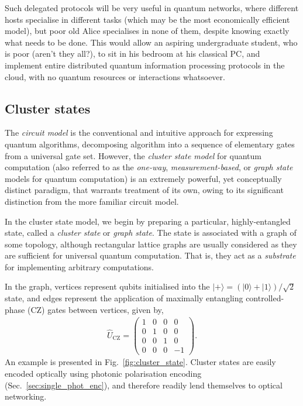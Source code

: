 \documentclass[aps,rmp,twocolumn,amsmath,amssymb,nofootinbib,superscriptaddress,longbibliography,floatfix]{revtex4-1}
\newcommand{\ket}[1]{|#1\rangle}
\begin{document}
Such delegated protocols will be very useful in quantum networks, where different hosts specialise in different tasks (which may be the most economically efficient model), but poor old Alice specialises in none of them, despite knowing exactly what needs to be done. This would allow an aspiring undergraduate student, who is poor (aren't they all?), to sit in his bedroom at his classical PC, and implement entire distributed quantum information processing protocols in the cloud, with no quantum resources or interactions whatsoever.

%
%

\subsection{Cluster states} \label{sec:CSQC}

The \emph{circuit model} is the conventional and intuitive approach for expressing quantum algorithms, decomposing algorithm into a sequence of elementary gates from a universal gate set. However, the \emph{cluster state model} for quantum computation \cite{bib:Raussendorf01, bib:Raussendorf03, bib:Nielsen06} (also referred to as the \emph{one-way}, \emph{measurement-based}, or \emph{graph state} models for quantum computation) is an extremely powerful, yet conceptually distinct paradigm, that warrants treatment of its own, owing to its significant distinction from the more familiar circuit model.

In the cluster state model, we begin by preparing a particular, highly-entangled state, called a \emph{cluster state} or \emph{graph state}. The state is associated with a graph of some topology, although rectangular lattice graphs are usually considered as they are sufficient for universal quantum computation. That is, they act as a \emph{substrate} for implementing arbitrary computations.

In the graph, vertices represent qubits initialised into the \mbox{$\ket{+}=(\ket{0}+\ket{1})/\sqrt{2}$} state, and edges represent the application of maximally entangling controlled-phase (CZ) gates between vertices, given by,
\begin{align}
\hat{U}_\mathrm{CZ} = \left(\begin{array}{cccc}
1 & 0 & 0 & 0 \\
0 & 1 & 0 & 0 \\
0 & 0 & 1 & 0 \\
0 & 0 & 0 & -1 \end{array}\right).
\end{align}
An example is presented in Fig.~\ref{fig:cluster_state}. Cluster states are easily encoded optically using photonic polarisation encoding (Sec.~\ref{sec:single_phot_enc}), and therefore readily lend themselves to optical networking.
\end{document}
